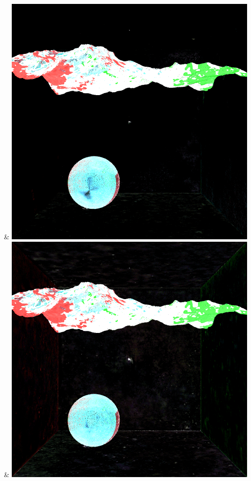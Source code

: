 & \includegraphics[width=\linewidth]{figures/py/tests/quality_comparison/nrc+lt+bal_1spp_caustics_small.png}
& \includegraphics[width=\linewidth]{figures/py/tests/quality_comparison/nrc+lt+balcam_1spp_caustics_small.png}
